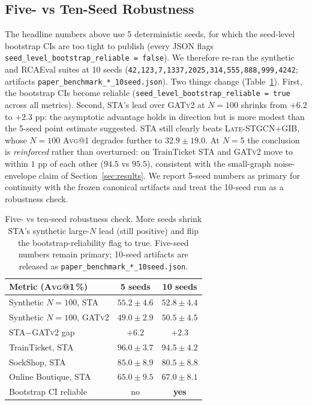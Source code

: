 \documentclass[11pt,a4paper]{article}
\makeatletter
\newcommand{\Avg}[1]{\textsc{Avg}@{#1}}
\newcommand{\STA}{\textsc{STA}}
\newcommand{\GATv}{\textsc{GATv2}}
\newcommand{\Late}{\textsc{Late-STGCN+GIB}}
\makeatother
\begin{document}
\subsection{Five- vs Ten-Seed Robustness}
\label{sec:robustness}

The headline numbers above use 5 deterministic seeds, for which the
seed-level bootstrap CIs are too tight to publish (every JSON flags
\texttt{seed\_level\_bootstrap\_reliable = false}). We therefore re-ran the
synthetic and RCAEval suites at 10 seeds
(\texttt{42,123,7,1337,2025,314,555,888,999,4242}; artifacts
\texttt{paper\_benchmark\_*\_10seed.json}). Two things change
(Table~\ref{tab:stability}). First, the bootstrap CIs become reliable
(\texttt{seed\_level\_bootstrap\_reliable = true} across all metrics).
Second, \STA{}'s lead over \GATv{} at $N{=}100$ shrinks from $+6.2$ to
$+2.3$ pp: the asymptotic advantage holds in direction but is more modest than
the 5-seed point estimate suggested. \STA{} still clearly beats \Late{}, whose
$N{=}100$ \Avg{1} degrades further to $32.9 \pm 19.0$. At $N{=}5$ the
conclusion is \emph{reinforced} rather than overturned: on TrainTicket \STA{}
and \GATv{} move to within $1$ pp of each other ($94.5$ vs $95.5$), consistent
with the small-graph noise-envelope claim of Section~\ref{sec:results}. We
report 5-seed numbers as primary for continuity with the frozen canonical
artifacts and treat the 10-seed run as a robustness check.

\begin{table}[h]
\centering\small
\begin{tabular}{lcc}
\toprule
\textbf{Metric (\Avg{1}\,\%)} & \textbf{5 seeds} & \textbf{10 seeds} \\
\midrule
Synthetic $N{=}100$, \STA{}   & $55.2 \pm 4.6$ & $52.8 \pm 4.4$ \\
Synthetic $N{=}100$, \GATv{}  & $49.0 \pm 2.9$ & $50.5 \pm 4.5$ \\
\quad \STA{}$-$\GATv{} gap     & $+6.2$         & $+2.3$ \\
TrainTicket, \STA{}           & $96.0 \pm 3.7$ & $94.5 \pm 4.2$ \\
SockShop, \STA{}              & $85.0 \pm 8.9$ & $80.5 \pm 8.8$ \\
Online Boutique, \STA{}       & $65.0 \pm 9.5$ & $67.0 \pm 8.1$ \\
\midrule
Bootstrap CI reliable         & no             & \textbf{yes} \\
\bottomrule
\end{tabular}
\caption{Five- vs ten-seed robustness check. More seeds shrink \STA{}'s
synthetic large-$N$ lead (still positive) and flip the bootstrap-reliability
flag to true. Five-seed numbers remain primary; 10-seed artifacts are released
as \texttt{paper\_benchmark\_*\_10seed.json}.}
\label{tab:stability}
\end{table}
\end{document}
